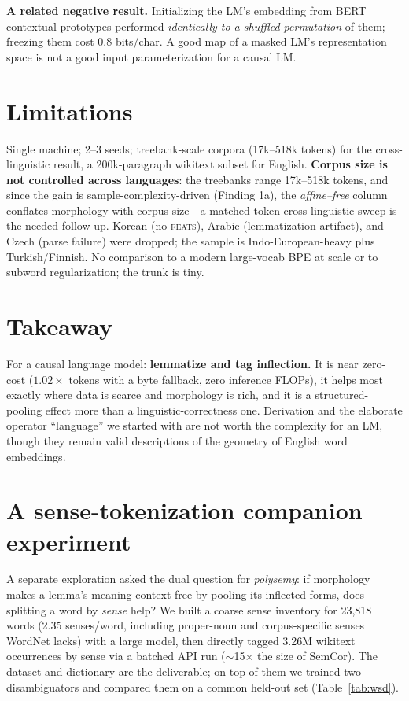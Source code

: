 \documentclass[11pt]{article}
\newcommand{\bc}{bits/char}
\begin{document}
\noindent\textbf{A related negative result.} Initializing the LM's embedding from BERT
contextual prototypes performed \emph{identically to a shuffled permutation} of them; freezing
them cost 0.8 \bc. A good map of a masked LM's representation space is not a good input
parameterization for a causal LM.

\section{Limitations}\label{sec:limits}
Single machine; 2--3 seeds; treebank-scale corpora (17k--518k tokens) for the cross-linguistic
result, a 200k-paragraph wikitext subset for English. \textbf{Corpus size is not controlled
across languages}: the treebanks range 17k--518k tokens, and since the gain is
sample-complexity-driven (Finding 1a), the \emph{affine--free} column conflates morphology
with corpus size---a matched-token cross-linguistic sweep is the needed follow-up. Korean
(no \textsc{feats}), Arabic (lemmatization artifact), and Czech (parse failure) were dropped; the sample is Indo-European-heavy plus Turkish/Finnish. No comparison to
a modern large-vocab BPE at scale or to subword regularization; the trunk is tiny.

\section{Takeaway}
For a causal language model: \textbf{lemmatize and tag inflection.} It is near zero-cost
($1.02\times$ tokens with a byte fallback, zero inference FLOPs), it helps most exactly where
data is scarce and morphology is rich, and it is a structured-pooling effect more than a
linguistic-correctness one. Derivation and the elaborate operator ``language'' we started with
are not worth the complexity for an LM, though they remain valid descriptions of the geometry
of English word embeddings.




\appendix
\section{A sense-tokenization companion experiment}
\label{app:sense}
A separate exploration asked the dual question for \emph{polysemy}: if morphology makes a
lemma's meaning context-free by pooling its inflected forms, does splitting a word by
\emph{sense} help? We built a coarse sense inventory for 23{,}818 words (2.35 senses/word,
including proper-noun and corpus-specific senses WordNet lacks) with a large model, then
directly tagged 3.26M wikitext occurrences by sense via a batched API run
($\sim$15$\times$ the size of SemCor). The dataset and dictionary are the deliverable; on top
of them we trained two disambiguators and compared them on a common held-out set
(Table~\ref{tab:wsd}).
\end{document}
